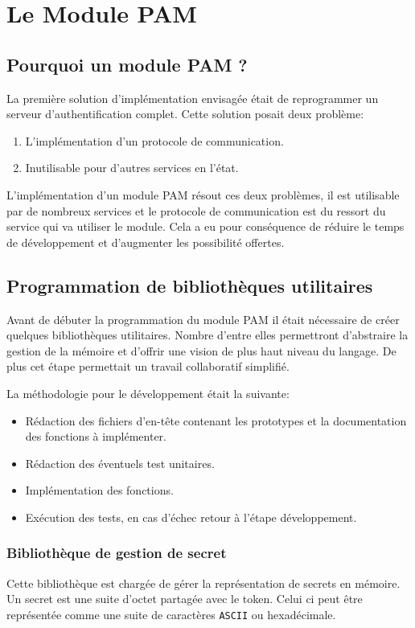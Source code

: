\newpage

\section{Le Module PAM}
\subsection{Pourquoi un module PAM ?}
La première solution d'implémentation envisagée était de reprogrammer un
serveur d'authentification complet. Cette solution posait deux problème:
\begin{enumerate}
  \item L'implémentation d'un protocole de communication.
  \item Inutilisable pour d'autres services en l'état.
\end{enumerate}

L'implémentation d'un module PAM résout ces deux problèmes, il est utilisable
par de nombreux services et le protocole de communication est du ressort du
service qui va utiliser le module. Cela a eu pour conséquence de réduire le
temps de développement et d'augmenter les possibilité offertes.

\subsection{Programmation de bibliothèques utilitaires}
Avant de débuter la programmation du module PAM il était nécessaire de créer
quelques bibliothèques utilitaires. Nombre d'entre elles permettront
d'abstraire la gestion de la mémoire et d'offrir une vision de plus haut niveau
du langage. De plus cet étape permettait un travail collaboratif simplifié.

La méthodologie pour le développement était la suivante:
\begin{itemize}
  \item Rédaction des fichiers d'en-tête contenant les prototypes et la 
  documentation des fonctions à implémenter. 
  \item Rédaction des éventuels test unitaires.
  \item Implémentation des fonctions.
  \item Exécution des tests, en cas d'échec retour à l'étape développement.
\end{itemize}

\subsubsection{Bibliothèque de gestion de secret}
Cette bibliothèque est chargée de gérer la représentation de secrets en mémoire.
Un secret est une suite d'octet partagée avec le token. Celui ci peut être 
représentée comme une suite de caractères \verb?ASCII? ou hexadécimale.

